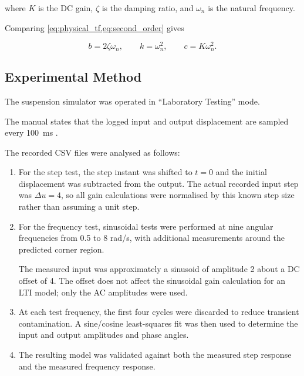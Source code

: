 \documentclass[12pt,a4paper]{article}
\begin{document}
where $K$ is the DC gain, $\zeta$ is the damping ratio, and
$\omega_n$ is the natural frequency.

Comparing
\cref{eq:physical_tf,eq:second_order}
gives

\begin{equation}
    b=2\zeta\omega_n,
    \qquad
    k=\omega_n^2,
    \qquad
    c=K\omega_n^2.
    \label{eq:parameter_map}
\end{equation}

\subsection{Experimental Method}

The suspension simulator was operated in ``Laboratory Testing''
mode.

The manual states that the logged input and output displacement
are sampled every \SI{100}{ms} \cite{manual}.

The recorded CSV files were analysed as follows:

\begin{enumerate}

    \item
    For the step test, the step instant was shifted to $t=0$ and
    the initial displacement was subtracted from the output.
    The actual recorded input step was $\Delta u=4$, so all gain
    calculations were normalised by this known step size rather
    than assuming a unit step.

    \item
    For the frequency test, sinusoidal tests were performed at
    nine angular frequencies from 0.5 to 8 rad/s, with additional
    measurements around the predicted corner region.

    The measured input was approximately a sinusoid of amplitude
    2 about a DC offset of 4. The offset does not affect the
    sinusoidal gain calculation for an LTI model; only the AC
    amplitudes were used.

    \item
    At each test frequency, the first four cycles were discarded
    to reduce transient contamination. A sine/cosine
    least-squares fit was then used to determine the input and
    output amplitudes and phase angles.

    \item
    The resulting model was validated against both the measured
    step response and the measured frequency response.

\end{enumerate}
\end{document}
